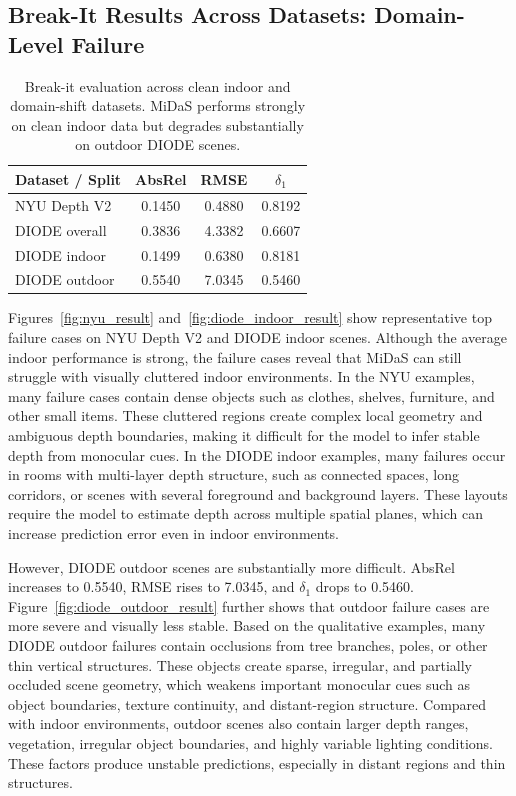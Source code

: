 \documentclass[10pt]{article}
\begin{document}
\subsection{Break-It Results Across Datasets: Domain-Level Failure}

\begin{table}[H]
\centering
\begin{tabular}{lccc}
\toprule
Dataset / Split & AbsRel & RMSE & $\delta_1$ \\
\midrule
NYU Depth V2 & 0.1450 & 0.4880 & 0.8192 \\
DIODE overall & 0.3836 & 4.3382 & 0.6607 \\
DIODE indoor & 0.1499 & 0.6380 & 0.8181 \\
DIODE outdoor & 0.5540 & 7.0345 & 0.5460 \\
\bottomrule
\end{tabular}
\caption{Break-it evaluation across clean indoor and domain-shift datasets. MiDaS performs strongly on clean indoor data but degrades substantially on outdoor DIODE scenes.}
\label{tab:cross-dataset-breakit}
\end{table}

Figures~\ref{fig:nyu_result} and~\ref{fig:diode_indoor_result} show representative top failure cases on NYU Depth V2 and DIODE indoor scenes. Although the average indoor performance is strong, the failure cases reveal that MiDaS can still struggle with visually cluttered indoor environments. In the NYU examples, many failure cases contain dense objects such as clothes, shelves, furniture, and other small items. These cluttered regions create complex local geometry and ambiguous depth boundaries, making it difficult for the model to infer stable depth from monocular cues. In the DIODE indoor examples, many failures occur in rooms with multi-layer depth structure, such as connected spaces, long corridors, or scenes with several foreground and background layers. These layouts require the model to estimate depth across multiple spatial planes, which can increase prediction error even in indoor environments.

However, DIODE outdoor scenes are substantially more difficult. AbsRel increases to 0.5540, RMSE rises to 7.0345, and $\delta_1$ drops to 0.5460. Figure~\ref{fig:diode_outdoor_result} further shows that outdoor failure cases are more severe and visually less stable. Based on the qualitative examples, many DIODE outdoor failures contain occlusions from tree branches, poles, or other thin vertical structures. These objects create sparse, irregular, and partially occluded scene geometry, which weakens important monocular cues such as object boundaries, texture continuity, and distant-region structure. Compared with indoor environments, outdoor scenes also contain larger depth ranges, vegetation, irregular object boundaries, and highly variable lighting conditions. These factors produce unstable predictions, especially in distant regions and thin structures.
\end{document}
